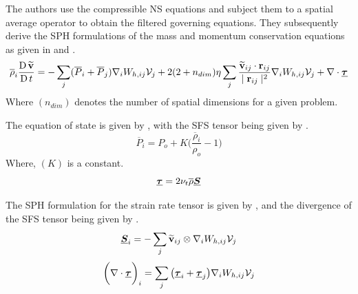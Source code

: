 The authors use the compressible NS equations and subject them to a spatial average operator to obtain the filtered governing equations. They subsequently derive the SPH formulations of the mass and momentum conservation equations as given in  and .
\begin{equation}
    \overline{\rho}_i\frac{\operatorname{D} \widetilde{\mathbf{v}}}{\operatorname{D} t} = - \sum_j (\overline{P}_i + \overline{P}_j) \nabla_{i} W_{h, ij} \mathcal{V}_j + 2(2+n_{dim})\eta \sum_j \frac{\widetilde{\mathbf{v}}_{ij} \cdot \mathbf{r}_{ij}}{\mid \mathbf{r}_{ij} \mid^{2}}\nabla_{i} W_{h, ij} \mathcal{V}_j + \nabla \cdot \underline{\bm{\tau}}
    \label{eq:Okraschevski2022-mom-sph}
\end{equation}
Where $(n_{dim})$ denotes the number of spatial dimensions for a given problem.

The equation of state is given by , with the SFS tensor being given by .
\begin{equation}
    \overline{P}_i = P_o + K\bigg(\frac{\overline{\rho}_i}{\rho_o} - 1 \bigg)
    \label{eq:Okraschevski2022-eos-sph}
\end{equation}
Where, $(K)$ is a constant.
\begin{equation}
    \underline{\bm{\tau}} = 2\nu_t\overline{\rho}\underline{\bm{S}}
    \label{eq:Okraschevski2022-tau}
\end{equation}

The SPH formulation for the strain rate tensor is given by , and the divergence of the SFS tensor being given by .
\begin{equation}
    \underline{\bm{S}}_i = - \sum_j \widetilde{\mathbf{v}}_{ij} \otimes \nabla_{i} W_{h, ij} \mathcal{V}_j
    \label{eq:Okraschevski2022-S-tensor-sph}
\end{equation}
\begin{equation}
    \bigg(\nabla \cdot \underline{\bm{\tau}}\bigg)_i =\sum_j \big( \underline{\bm{\tau}}_i + \underline{\bm{\tau}}_j \big) \nabla_{i} W_{h, ij} \mathcal{V}_j
    \label{eq:Okraschevski2022-div-tau-sph}
\end{equation}

